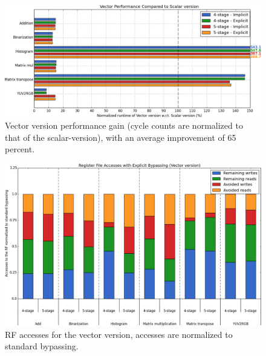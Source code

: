 \begin{figure}[t!]
\centering
\hspace*{-.12in}
\includegraphics[width=\textwidth]{figures/stats/vector_cycles}
\caption{Vector version performance gain (cycle counts are normalized to that of the scalar-version), with an average improvement of 65 percent.}
\label{fig:vector_scalar_cmp}
\end{figure}


\begin{figure}[b!]
\centering
\hspace*{-.12in}
\includegraphics[width=.875\textwidth]{figures/stats/vec_accesses}
\caption{RF accesses for the vector version, accesses are normalized to standard bypassing.}
\label{fig:vec_accesses}
\end{figure}







